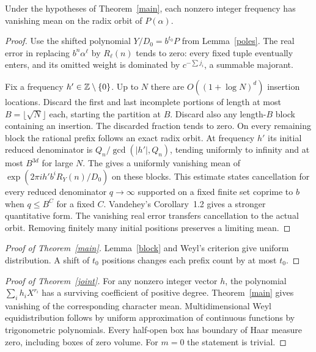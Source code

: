 \documentclass[11pt]{article}
\newcommand{\ee}[1]{\exp(2\pi i #1)}
\begin{document}
\begin{lemma}\label{block}
Under the hypotheses of Theorem~\ref{main}, each nonzero integer
frequency has vanishing mean on the radix orbit of \(P(\alpha)\).
\end{lemma}
\begin{proof}
Use the shifted polynomial \(Y/D_0=b^{t_0}P\) from Lemma~\ref{poles}.
The real error in replacing \(b^n\alpha^\ell\) by \(R_\ell(n)\) tends to zero:
every fixed tuple eventually enters, and its omitted weight is dominated
by \(c^{-\sum j_i}\), a summable majorant.

Fix a frequency \(h'\in\mathbb Z\setminus\{0\}\). Up to \(N\) there are
\(O((1+\log N)^d)\) insertion locations. Discard the first and last
incomplete portions of length at most \(B=\lfloor\sqrt N\rfloor\) each,
starting the partition at \(B\). Discard also any length-\(B\) block
containing an insertion. The discarded fraction tends to zero.
On every remaining block the rational prefix follows an exact radix orbit.
At frequency \(h'\) its initial reduced denominator is
\(Q_n/\gcd(|h'|,Q_n)\), tending uniformly to infinity and at most \(B^{3d}\)
for large \(N\). The  gives a uniformly vanishing mean of \(\ee{h'b^i R_Y(n)/D_0}\)
on these blocks. This estimate states cancellation for every reduced
denominator \(q\to\infty\) supported on a fixed finite set coprime to \(b\)
when \(q\le B^C\) for a fixed \(C\). Vandehey's Corollary~1.2 gives a
stronger quantitative form. The vanishing real error transfers cancellation
to the actual orbit. Removing finitely many initial positions preserves
a limiting mean.
\end{proof}
\begin{proof}[Proof of Theorem~\ref{main}]
Lemma~\ref{block} and Weyl's criterion give uniform distribution.
A shift of \(t_0\) positions changes each prefix count by at most \(t_0\).
\end{proof}
\begin{proof}[Proof of Theorem~\ref{joint}]
For any nonzero integer vector \(h\), the polynomial \(\sum_i h_iX^{r_i}\)
has a surviving coefficient of positive degree. Theorem~\ref{main} gives
vanishing of the corresponding character mean. Multidimensional Weyl
equidistribution follows by uniform approximation of continuous functions
by trigonometric polynomials. Every half-open box has boundary of Haar
measure zero, including boxes of zero volume. For \(m=0\) the statement is trivial.
\end{proof}
\end{document}
